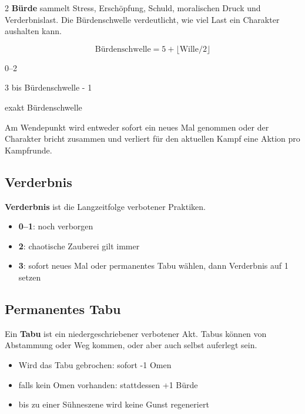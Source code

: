 \begin{multicols*}{2}
\textbf{Bürde} sammelt Stress, Erschöpfung, Schuld, moralischen Druck und Verderbnislast.
Die Bürdenschwelle verdeutlicht, wie viel Last ein Charakter aushalten kann.

\[
\text{Bürdenschwelle} = 5 + \lfloor \text{Wille} / 2 \rfloor
\]

\begin{description}[style=nextline,leftmargin=0pt]
\item[\textbf{Stabil}] 0--2
\item[\textbf{Belastet}] 3 bis Bürdenschwelle - 1
\item[\textbf{Wendepunkt}] exakt Bürdenschwelle
\end{description}

Am Wendepunkt wird entweder sofort ein neues Mal genommen oder der Charakter bricht zusammen und verliert für den aktuellen Kampf eine Aktion pro Kampfrunde.

\subsection{Verderbnis}\label{sec:verderbnis}

\textbf{Verderbnis} ist die Langzeitfolge verbotener Praktiken.

\begin{itemize}[leftmargin=*]
\item \textbf{0--1}: noch verborgen
\item \textbf{2}: chaotische Zauberei gilt immer
\item \textbf{3}: sofort neues Mal oder permanentes Tabu wählen, dann Verderbnis auf 1 setzen
\end{itemize}

\subsection{Permanentes Tabu}\label{sec:permanentes-tabu}

Ein \textbf{Tabu} ist ein niedergeschriebener verbotener Akt.
Tabus können von Abstammung oder Weg kommen, oder aber auch selbst auferlegt sein.

\begin{itemize}[leftmargin=*]
\item Wird das Tabu gebrochen: sofort -1 Omen
\item falls kein Omen vorhanden: stattdessen +1 Bürde
\item bis zu einer Sühneszene wird keine Gunst regeneriert
\end{itemize}


\end{multicols*}

